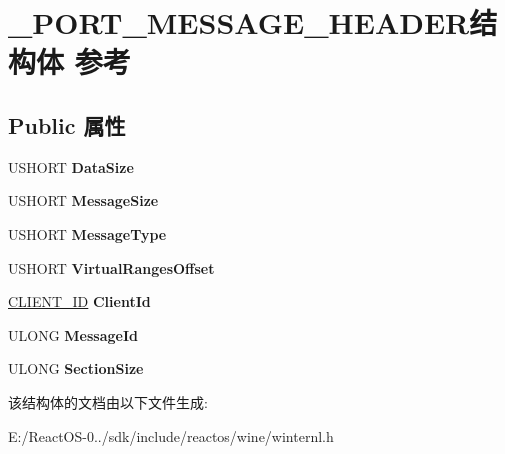 \hypertarget{struct___p_o_r_t___m_e_s_s_a_g_e___h_e_a_d_e_r}{}\section{\+\_\+\+P\+O\+R\+T\+\_\+\+M\+E\+S\+S\+A\+G\+E\+\_\+\+H\+E\+A\+D\+E\+R结构体 参考}
\label{struct___p_o_r_t___m_e_s_s_a_g_e___h_e_a_d_e_r}
\subsection*{Public 属性}
\begin{DoxyCompactItemize}
\item 
\mbox{\label{struct___p_o_r_t___m_e_s_s_a_g_e___h_e_a_d_e_r_a4bb0d17c1a2f890c8262fb6748c3386f}} 
U\+S\+H\+O\+RT {\bfseries Data\+Size}
\item 
\mbox{\label{struct___p_o_r_t___m_e_s_s_a_g_e___h_e_a_d_e_r_a1cba2b376f161362426532604398c253}} 
U\+S\+H\+O\+RT {\bfseries Message\+Size}
\item 
\mbox{\label{struct___p_o_r_t___m_e_s_s_a_g_e___h_e_a_d_e_r_af9dfb3b0fb20c7f128944f58da497b22}} 
U\+S\+H\+O\+RT {\bfseries Message\+Type}
\item 
\mbox{\label{struct___p_o_r_t___m_e_s_s_a_g_e___h_e_a_d_e_r_ad2a89d255a22aef0fde7dd7ecfc4d5db}} 
U\+S\+H\+O\+RT {\bfseries Virtual\+Ranges\+Offset}
\item 
\mbox{\label{struct___p_o_r_t___m_e_s_s_a_g_e___h_e_a_d_e_r_ab319526b9e1fc8e1a55fb5455e2c1e82}} 
\hyperlink{struct___c_l_i_e_n_t___i_d}{C\+L\+I\+E\+N\+T\+\_\+\+ID} {\bfseries Client\+Id}
\item 
\mbox{\label{struct___p_o_r_t___m_e_s_s_a_g_e___h_e_a_d_e_r_a8add0b4b38a3e2d43386b01deb5e50ca}} 
U\+L\+O\+NG {\bfseries Message\+Id}
\item 
\mbox{\label{struct___p_o_r_t___m_e_s_s_a_g_e___h_e_a_d_e_r_adf67658dba176414153c36ef756749e9}} 
U\+L\+O\+NG {\bfseries Section\+Size}
\end{DoxyCompactItemize}


该结构体的文档由以下文件生成\+:\begin{DoxyCompactItemize}
\item 
E\+:/\+React\+O\+S-\/0../sdk/include/reactos/wine/winternl.\+h\end{DoxyCompactItemize}
